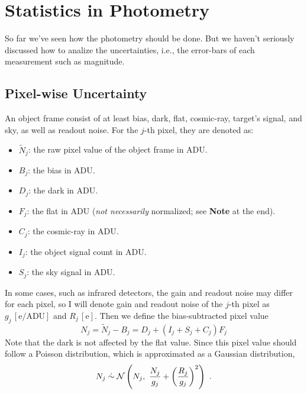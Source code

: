 \chapter{Statistics in Photometry}

So far we've seen how the photometry should be done. But we haven't seriously discussed how to analize the uncertainties, i.e., the error-bars of each measurement such as magnitude. 

\section{Pixel-wise Uncertainty}
An object frame consist of at least bias, dark, flat, cosmic-ray, target's signal, and sky, as well as readout noise. For the $ j $-th pixel, they are denoted as:
\begin{itemize}
\item $ \tilde{N}_j $: the raw pixel value of the object frame in ADU.
\item $ B_j $: the bias in ADU.
\item $ D_j $: the dark in ADU.
\item $ F_j $: the flat in ADU (\textit{not necessarily} normalized; see \textbf{Note} at the end).
\item $ C_j $: the cosmic-ray in ADU.
\item $ I_j $: the object signal count in ADU.
\item $ S_j $: the sky signal in ADU.
\end{itemize}
In some cases, such as infrared detectors, the gain and readout noise may differ for each pixel, so I will denote gain and readout noise of the $ j $-th pixel as $ g_j \,[\mathrm{e/ADU}]$ and $ R_j \,[\mathrm{e}] $. Then we define the bias-subtracted pixel value
\begin{equation}
  N_j = \tilde{N}_j - B_j = D_j + (I_j + S_j + C_j) F_j
\end{equation}
Note that the dark is not affected by the flat value. Since this pixel value should follow a Poisson distribution, which is approximated as a Gaussian distribution,
\begin{equation}
  N_j 
    \mathrel{\dot{\sim}} \mathcal{N} \left (
      N_j ,~ 
      \frac{N_j}{g_j} + \left (\frac{R_j}{g_j} \right )^2 
    \right ) ~.
\end{equation}


